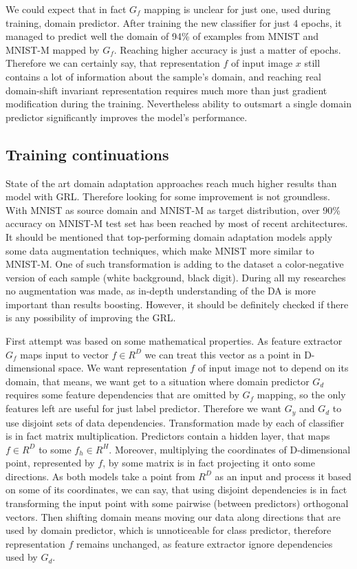 \documentclass{article}
\begin{document}
\par
We could expect that in fact $G_{f}$ mapping is unclear for just one, used during training, domain predictor. After training the new classifier for just 4 epochs, it managed to predict well the domain of 94\% of examples from MNIST and MNIST-M mapped by $G_{f}$. Reaching higher accuracy is just a matter of epochs. Therefore we can certainly say, that representation $f$ of input image $x$ still contains a lot of information about the sample's domain, and reaching real domain-shift invariant representation requires much more than just gradient modification during the training. Nevertheless ability to outsmart a single domain predictor significantly improves the model's performance.

\subsection{Training continuations}
State of the art domain adaptation approaches reach much higher results than model with GRL. Therefore looking for some improvement is not groundless. With MNIST as source domain and MNIST-M as target distribution, over 90\% accuracy on MNIST-M test set has been reached by most of recent architectures. It should be mentioned that top-performing domain adaptation models apply some data augmentation techniques, which make MNIST more similar to MNIST-M. One of such transformation is adding to the dataset a color-negative version of each sample (white background, black digit). During all my researches no augmentation was made, as in-depth understanding of the DA is more important than results boosting. However, it should be definitely checked if there is any possibility of improving the GRL.
\par
First attempt was based on some mathematical properties. As feature extractor $G_{f}$ maps input to vector $f \in R^{D}$ we can treat this vector as a point in D-dimensional space. We want representation $f$ of input image not to depend on its domain, that means, we want get to a situation where domain predictor $G_{d}$ requires some feature dependencies that are omitted by $G_{f}$ mapping, so the only features left are useful for just label predictor. Therefore we want $G_{y}$ and $G_{d}$ to use disjoint sets of data dependencies. Transformation made by each of classifier is in fact matrix multiplication. Predictors contain a hidden layer, that maps $f \in R^{D}$ to some $f_{h} \in R^{H}$. Moreover, multiplying the coordinates of D-dimensional point, represented by $f$, by some matrix is in fact projecting it onto some directions.  As both models take a point from $R^{D}$ as an input and process it based on some of its coordinates, we can say, that using disjoint dependencies is in fact transforming the input point with some pairwise (between predictors) orthogonal vectors. Then shifting domain means moving our data along directions that are used by domain predictor, which is unnoticeable for class predictor, therefore representation $f$ remains unchanged, as feature extractor ignore dependencies used by $G_{d}$.
\end{document}
